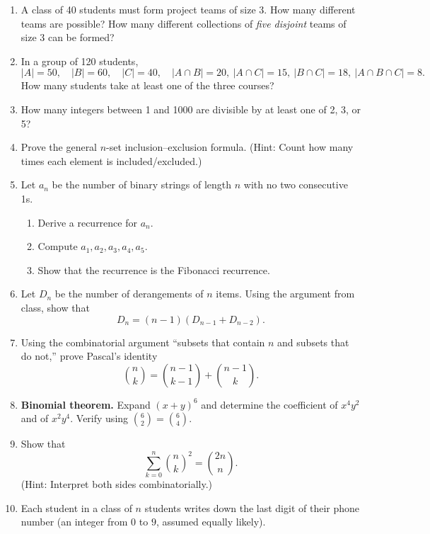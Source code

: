 \begin{enumerate}
\item  
A class of 40 students must form project teams of size 3.  
How many different teams are possible?  
How many different collections of \emph{five disjoint} teams of size 3 can be formed?

\item 
In a group of 120 students,
\[
|A| = 50,\quad |B| = 60,\quad |C| = 40,\quad 
|A \cap B| = 20,\ |A \cap C| = 15,\ |B \cap C| = 18,\ |A \cap B \cap C| = 8.
\]
How many students take at least one of the three courses?

\item  
How many integers between 1 and 1000 are divisible by at least one of 2, 3, or 5?

\item  
Prove the general $n$-set inclusion–exclusion formula.  
(Hint: Count how many times each element is included/excluded.)

\item
Let $a_n$ be the number of binary strings of length $n$ with no two consecutive 1s.  
\begin{enumerate}
    \item Derive a recurrence for $a_n$.  
    \item Compute $a_1, a_2, a_3, a_4, a_5$.  
    \item Show that the recurrence is the Fibonacci recurrence.
\end{enumerate}

\item  
Let $D_n$ be the number of derangements of $n$ items.  
Using the argument from class, show that  
\[
D_n = (n-1)(D_{n-1} + D_{n-2}).
\]

\item
Using the combinatorial argument “subsets that contain $n$ and subsets that do not,”  
prove Pascal’s identity  
\[
\binom{n}{k} = \binom{n-1}{k-1} + \binom{n-1}{k}.
\]

\item \textbf{Binomial theorem.}  
Expand $(x+y)^6$ and determine the coefficient of $x^4 y^2$ and of $x^2 y^4$.  
Verify using $\binom{6}{2} = \binom{6}{4}$.

\item 
Show that 
\[
\sum_{k=0}^n \binom{n}{k}^2 = \binom{2n}{n}.
\]
(Hint: Interpret both sides combinatorially.)


\item  
Each student in a class of $n$ students writes down the last digit of their phone number  
(an integer from $0$ to $9$, assumed equally likely).  


\end{enumerate}
